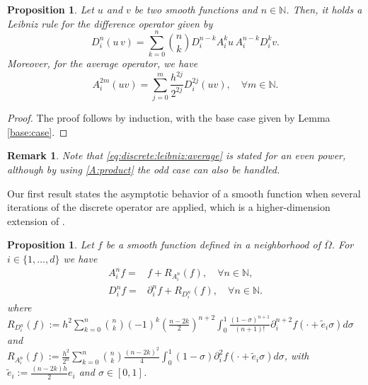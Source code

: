 \documentclass[11pt,oneside,leqno]{amsart}
\numberwithin{equation}{section}
\numberwithin{equation}{section}
\newtheorem{proposition}[theorem]{Proposition}
\newtheorem{remark}[theorem]{Remark}
\begin{document}
\begin{proposition}
Let $u$ and $v$ be two smooth functions and $n\in\mathbb{N}$. Then, it holds a Leibniz rule for the difference operator given by
\begin{equation}\label{eq:discreteleibniz}
    D_{i}^{n}(u\,v)=\sum_{k=0}^{n}\binom{n}{k}D_{i}^{n-k}A_{i}^{k}u\,A^{n-k}_{i}D^{k}_{i}v.
\end{equation}
Moreover, for the average operator, we have
\begin{equation}\label{eq:discrete:leibniz:average}
    A_{i}^{2m}(uv)=\sum_{j=0}^{m}\frac{h^{2j}}{2^{2j}}D_{i}^{2j}(uv),\quad\forall m\in\mathbb{N}.
\end{equation}
\end{proposition}
\begin{proof}
    The proof follows by induction, with the base case given by Lemma \ref{base:case}.
\end{proof}
\begin{remark}
    Note that \eqref{eq:discrete:leibniz:average} is stated for an even power, although by using \eqref{A:product} the odd case can also be handled.
\end{remark}
Our first result states the asymptotic behavior of a smooth function when several iterations of the discrete operator are applied, which is a  higher-dimension extension of \cite[Proposition 4.1]{LOP-2020}.
\begin{proposition}\label{prop:difference:average}
Let $f$ be a smooth function defined in a neighborhood of $\overline{\Omega}$. For 
$i\in\{ 1,\ldots,d\}$ we have
\begin{equation}\label{eq:ave:diff}
    \begin{split}
        A^{n}_{i}f=&f+R_{A_{i}^{n}}(f),\quad \forall n\in \mathbb{N},\\
        D^{n}_{i}f=&\partial_{i}^{n}f
        +R_{D_{i}^{n}}(f),\quad\forall n\in\mathbb{N
        }.
    \end{split}
\end{equation}
where  $\displaystyle R_{D_{i}^{n}}(f):=h^{2}\sum_{k=0}^{n}\binom{n}{k}(-1)^{k}\left(\frac{n-2k}{2} \right)^{n+2}\int_{0}^{1}\frac{(1-\sigma)^{n+1}}{(n+1)!}\partial_{i}^{n+2}f(\cdot+\tilde{e}_{i}\sigma)d\sigma$ and \\ $\displaystyle R_{A_{i}^{n}}(f):=\frac{h^{2}}{2^{n}}\sum_{k=0}^{n}\binom{n}{k}\frac{(n-2k)^{2}}{4}\int_{0}^{1}(1-\sigma)\partial_{i}^{2}f(\cdot+\tilde{e}_{i}\sigma)d\sigma$,
with $\tilde{e}_{i}:=\frac{(n-2k)h}{2}e_{i}$ and $\sigma\in[0,1]$.
\end{proposition}
\end{document}
